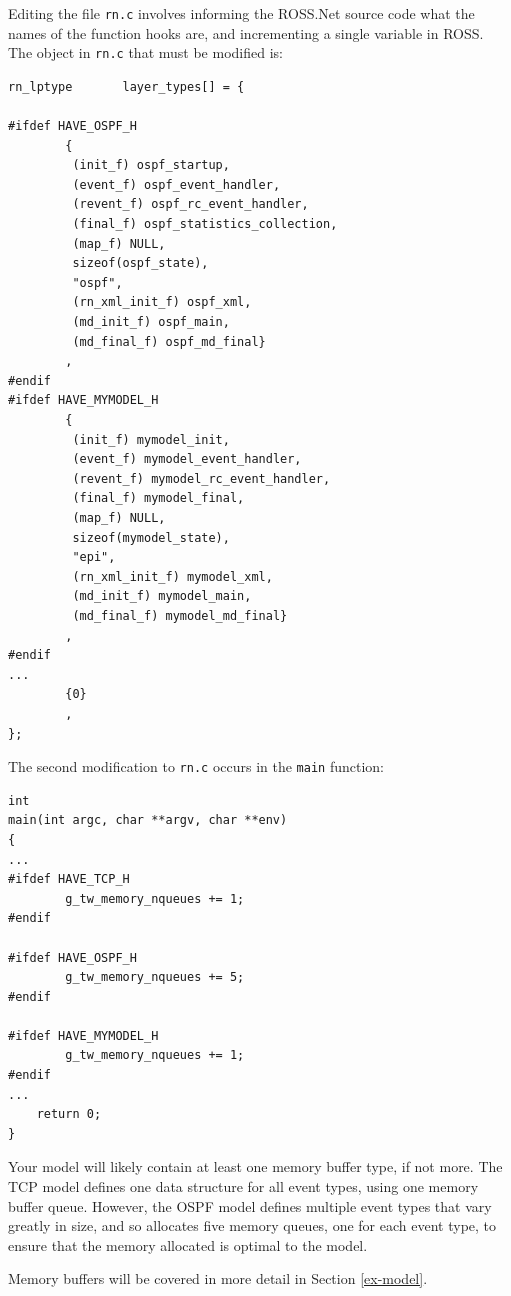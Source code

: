 \documentclass[conference,onecolumn]{IEEEtran}
\begin{document}
Editing the file {\tt rn.c} involves informing the ROSS.Net source code what the names of the function hooks are, and incrementing a single variable in ROSS.  The object in {\tt rn.c} that must be modified is:

\begin{small}\begin{verbatim}
rn_lptype       layer_types[] = {

#ifdef HAVE_OSPF_H
        {
         (init_f) ospf_startup,
         (event_f) ospf_event_handler,
         (revent_f) ospf_rc_event_handler,
         (final_f) ospf_statistics_collection,
         (map_f) NULL,
         sizeof(ospf_state),
         "ospf",
         (rn_xml_init_f) ospf_xml,
         (md_init_f) ospf_main,
         (md_final_f) ospf_md_final}
        ,
#endif
#ifdef HAVE_MYMODEL_H
        {
         (init_f) mymodel_init,
         (event_f) mymodel_event_handler,
         (revent_f) mymodel_rc_event_handler,
         (final_f) mymodel_final,
         (map_f) NULL,
         sizeof(mymodel_state),
         "epi",
         (rn_xml_init_f) mymodel_xml,
         (md_init_f) mymodel_main,
         (md_final_f) mymodel_md_final}
        ,
#endif
...
        {0}
        ,
};
\end{verbatim}\end{small}

The second modification to {\tt rn.c} occurs in the {\tt main} function:

\begin{small}\begin{verbatim}
int
main(int argc, char **argv, char **env)
{
...
#ifdef HAVE_TCP_H
        g_tw_memory_nqueues += 1;
#endif

#ifdef HAVE_OSPF_H
        g_tw_memory_nqueues += 5;
#endif

#ifdef HAVE_MYMODEL_H
        g_tw_memory_nqueues += 1;
#endif
...
    return 0;
}
\end{verbatim}\end{small}

Your model will likely contain at least one memory buffer type, if not more.  The TCP model defines one data structure for all event types, using one memory buffer queue.  However, the OSPF model defines multiple event types that vary greatly in size, and so allocates five memory queues, one for each event type, to ensure that the memory allocated is optimal to the model.

Memory buffers will be covered in more detail in Section \ref{ex-model}.
\end{document}
